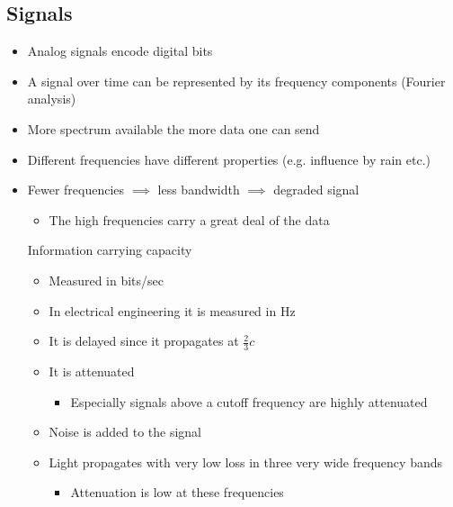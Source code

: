 \subsection{Signals}
\begin{itemize}
    \item Analog signals encode digital bits
    \item A signal over time can be represented by its frequency components (Fourier analysis)
    \item More spectrum available the more data one can send
    \item Different frequencies have different properties (e.g. influence by rain etc.)
     \item Fewer frequencies $\implies$ less bandwidth $\implies$ degraded signal
        \begin{itemize}
            \item The high frequencies carry a great deal of the data
        \end{itemize}
     Information carrying capacity
        \begin{itemize}
            \item Measured in bits/sec
            \item In electrical engineering it is measured in Hz
        \end{itemize}
        \begin{itemize}
            \item It is delayed since it propagates at $\frac{2}{3}c$
            \item It is attenuated
                \begin{itemize}
                    \item Especially signals above a cutoff frequency are highly attenuated
                \end{itemize}
            \item Noise is added to the signal
        \end{itemize}
        \begin{itemize}
            \item Light propagates with very low loss in three very wide frequency bands
                \begin{itemize}
                    \item Attenuation is low at these frequencies
                \end{itemize}
        \end{itemize}

\end{itemize}

